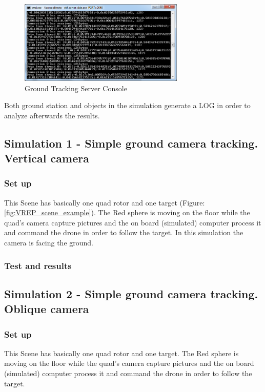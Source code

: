 \begin{figure}[h]
	\includegraphics[width=0.7\textwidth,natwidth=677,natheight=342]{../Images/c3/ground_tracking_server_console.png}
	\caption{Ground Tracking Server Console}
	\label{fig:Ground_Tracking_Server_Console}
\end{figure}

Both ground station and objects in the simulation generate a LOG in order to analyze afterwards the results.

\subsection{Simulation 1 - Simple ground camera tracking. Vertical camera}
\subsubsection{Set up}
This Scene has basically one quad rotor and one target (Figure: \ref{fig:VREP_scene_example}). The Red sphere is moving on the floor while the quad's camera capture pictures and the on board (simulated) computer process it and command the drone in order to follow the target. In this simulation the camera is facing the ground.

\subsubsection{Test and results}





\subsection{Simulation 2 - Simple ground camera tracking. Oblique camera}
\subsubsection{Set up}
This Scene has basically one quad rotor and one target. The Red sphere is moving on the floor while the quad's camera capture pictures and the on board (simulated) computer process it and command the drone in order to follow the target.

